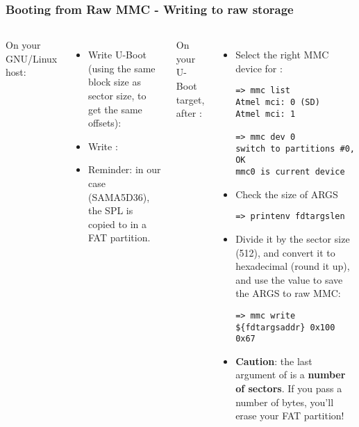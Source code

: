 \begin{frame}[fragile]
\frametitle{Booting from Raw MMC - Writing to raw storage}
   \scriptsize
   \begin{columns}
    On your GNU/Linux host:
    \begin{itemize}
	\item Write U-Boot (using the same block size as sector size, to
	      get the same offsets):\\
	\item Write :\\
	\item Reminder: in our case (SAMA5D36), the SPL is copied to
	       in a FAT partition.
    \end{itemize}
    On your U-Boot target,\\
    after :
    \begin{itemize}
	\item Select the right MMC\\
        device for :
	\begin{verbatim}
=> mmc list
Atmel mci: 0 (SD)
Atmel mci: 1

=> mmc dev 0
switch to partitions #0, OK
mmc0 is current device
\end{verbatim}
	\item Check the size of ARGS
\begin{verbatim}
=> printenv fdtargslen
\end{verbatim}

        \item Divide it by the sector size (512), and convert it to
              hexadecimal (round it up), and use the value to save the ARGS to raw MMC:
\begin{verbatim}
=> mmc write ${fdtargsaddr} 0x100 0x67
\end{verbatim}
	\item {\bf Caution}: the last argument of  is a
	      {\bf number of sectors}. If you pass a number of bytes, you'll erase your
	      FAT partition!
    \end{itemize}
   \end{columns}
\end{frame}

